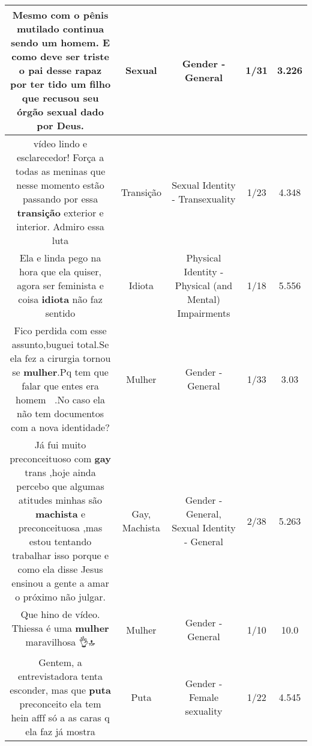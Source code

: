 \documentclass[11pt]{article}
\newlength\mylength
\begin{document}
\begin{center}
\begin{longtable}{|C{.65\mylength}|C{.30\mylength}|C{.12\mylength}|C{.12\mylength}|C{.12\mylength}|}
  \small Mesmo com o pênis mutilado continua sendo um homem. E como deve ser triste o pai desse rapaz por ter tido um filho que recusou seu órgão \textbf{sexual} dado por Deus.\normalsize   & Sexual & Gender - General & 1/31 & 3.226 \\  \hline
  \small vídeo lindo e esclarecedor! Força a todas as meninas que nesse momento estão passando por essa \textbf{transição} exterior e interior.  Admiro essa luta\normalsize   & Transição & Sexual Identity - Transexuality & 1/23 & 4.348 \\  \hline
  \small Ela e linda pego na hora que ela quiser, agora ser feminista e coisa \textbf{idiota} não faz sentido\normalsize   & Idiota & Physical Identity - Physical (and Mental) Impairments & 1/18 & 5.556 \\  \hline
  \small Fico perdida com esse assunto,buguei total.Se ela fez a cirurgia tornou se \textbf{mulher}.Pq tem que falar que entes era homem 🤷‍♀️.No caso ela não tem documentos com a nova identidade?\normalsize   & Mulher & Gender - General & 1/33 & 3.03 \\  \hline
  \small Já fui muito preconceituoso com \textbf{gay} trans ,hoje ainda percebo que algumas atitudes minhas são \textbf{machista} e preconceituosa ,mas estou tentando trabalhar isso porque e como ela disse Jesus ensinou a gente a amar o próximo não julgar.\normalsize   & Gay, Machista & Gender - General, Sexual Identity - General & 2/38 & 5.263 \\  \hline
  \small Que hino de vídeo. Thiessa é uma \textbf{mulher} maravilhosa 👌🔝\normalsize   & Mulher & Gender - General & 1/10 & 10.0 \\  \hline
  \small Gentem, a entrevistadora tenta esconder, mas que \textbf{puta} preconceito ela tem hein afff só a as caras q ela faz já mostra\normalsize   & Puta & Gender - Female sexuality & 1/22 & 4.545 \\  \hline

\end{longtable}
\end{center}
\end{document}
